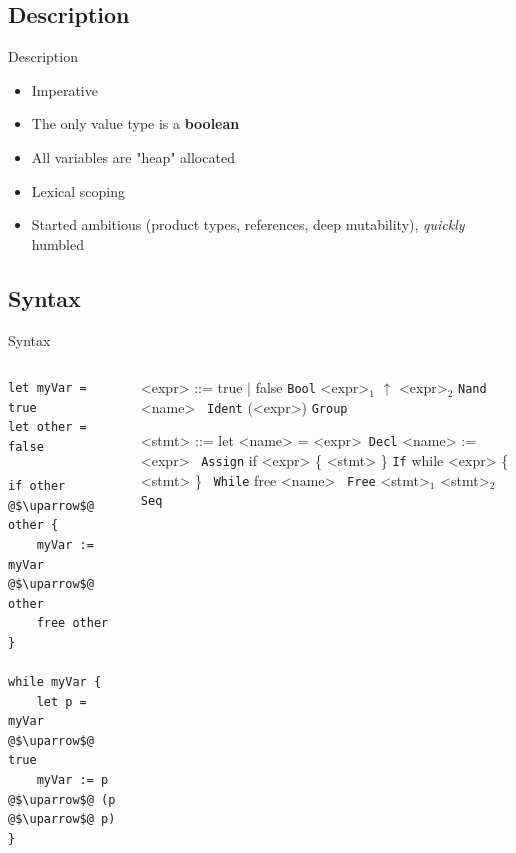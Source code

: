 \documentclass{EESD}
\begin{document}
\subsection{Description}
\begin{frame}{Description}
    \begin{itemize}
        \item Imperative 
        \item The only value type is a \textbf{boolean} 
        \item All variables are "heap" allocated
        \item Lexical scoping
        \item Started ambitious (product types, references, deep mutability)\pause, \textit{quickly} humbled
    \end{itemize}
\end{frame}

\subsection{Syntax}

\begin{frame}[fragile]{Syntax}

    \begin{columns}
        \begin{column}{0.4\textwidth}
            \begin{lstlisting}
let myVar = true
let other = false

if other @$\uparrow$@ other {
    myVar := myVar @$\uparrow$@ other
    free other
}

while myVar {
    let p = myVar @$\uparrow$@ true
    myVar := p @$\uparrow$@ (p @$\uparrow$@ p)
}
\end{lstlisting}
        \end{column}

        \begin{column}{0.6\textwidth}
            \setlength{\grammarindent}{6em}

            \begin{grammar}
                <expr> ::= true | false \qquad\;\;\;\; \texttt{Bool}
                \alt <expr>$_1$ $\uparrow$ <expr>$_2$ \; \texttt{Nand}
                \alt <name> \qquad\qquad\;\, \texttt{Ident}
                \alt (<expr>) \qquad\qquad\: \texttt{Group}

                <stmt> ::= let <name> = <expr> \quad\;\;\,\texttt{Decl}
                \alt <name> := <expr> \qquad\;\, \texttt{Assign}
                \alt if <expr> \{ <stmt> \} \quad\;\; \texttt{If}
                \alt while <expr> \{ <stmt> \} \ \texttt{While}
                \alt free <name> \qquad\qquad\quad\, \texttt{Free}
                \alt <stmt>$_1$ <stmt>$_2$ \qquad\quad\; \texttt{Seq}
            \end{grammar}
        \end{column}
    \end{columns}

\end{frame}
\end{document}
